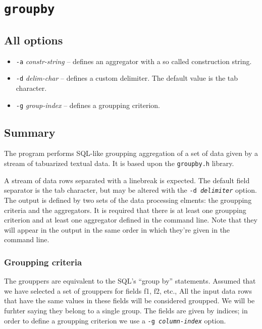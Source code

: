 \documentclass{report}
\begin{document}
\section{\texttt{groupby}}

	\subsection{All options}
	\begin{itemize}
		\item \texttt{-a} \textit{constr-string} -- defines an aggregator with a
			so called construction string.
		\item \texttt{-d} \textit{delim-char} -- defines a custom delimiter.
			The default value is the tab character.
		\item \texttt{-g} \textit{group-index} -- defines a groupping criterion.
	\end{itemize}

	\subsection{Summary}
	The program performs SQL-like groupping aggregation of a set of data given by a
	stream of tabuarized textual data. It is based upon the \texttt{groupby.h} library.

	A stream of data rows separated with a linebreak is expected. The default
	field separator is the tab character, but may be altered with the
	\texttt{-d \textit{delimiter}} option. The output is defined by two sets
	of the data processing elments: the groupping criteria and the aggregators.
	It is required that there is at least one groupping criterion and at least one
	aggregator defined in the command line. Note that they will appear in the output
	in the same order in which they're given in the command line.

	\subsubsection{Groupping criteria}
	The grouppers are equivalent to the SQL's ``group by'' statements.
	Assumed that we have selected a set of grouppers for fields f1, f2, etc.,
	All the input data rows that have the same values in these fields will be
	considered groupped. We will be furhter saying they belong to a single group.
	The fields are given by indices; in order to define a groupping criterion we use
	a \texttt{-g \textit{column-index}} option.
\end{document}
